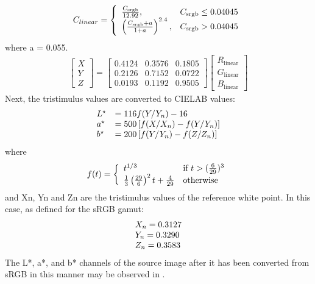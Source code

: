 \begin{eqnarray}
C_{linear} = \left\{
  \begin{array}{l l}
  	\frac{C_\mathrm{srgb}}{12.92}, & C_\mathrm{srgb}\le0.04045\\
	\left(\frac{C_\mathrm{srgb}+a}{1+a}\right)^{2.4}, & C_\mathrm{srgb}>0.04045
  \end{array} \right. 
\end{eqnarray}
where a = 0.055.
\begin{eqnarray}
\begin{bmatrix}
X\\Y\\Z\end{bmatrix}=
\begin{bmatrix}
0.4124&0.3576&0.1805\\
0.2126&0.7152&0.0722\\
0.0193&0.1192&0.9505
\end{bmatrix}
\begin{bmatrix}
R_\mathrm{linear}\\ 
G_\mathrm{linear}\\ 
B_\mathrm{linear}
\end{bmatrix}
\end{eqnarray}
Next, the tristimulus values are converted to CIELAB values:
\begin{eqnarray}
\left.
  \begin{array}{l l}
   L^\star & = 116 f(Y/Y_n) - 16\\
   a^\star & = 500 \left[f(X/X_n) - f(Y/Y_n)\right]\\
   b^\star & = 200 \left[f(Y/Y_n) - f(Z/Z_n)\right]
  \end{array} \right. 
\end{eqnarray}
where 
\begin{eqnarray}
f(t) = \left\{
  \begin{array}{l l}
  t^{1/3} & \text{if } t > (\frac{6}{29})^3 \\
  \frac13 \left( \frac{29}{6} \right)^2 t + \frac{4}{29} & \text{otherwise}
\end{array} \right. 
\end{eqnarray}
and Xn, Yn and Zn are the tristimulus values of the reference white point.  In this case, as defined for the sRGB gamut:
\begin{eqnarray}
\begin{array}{l l}
X_{n} = 0.3127\\
Y_{n} = 0.3290\\
Z_{n} = 0.3583
\end{array}
\end{eqnarray}
The L*, a*, and b* channels of the source image after it has been converted from sRGB in this manner may be observed in .

